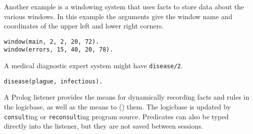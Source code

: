 Another example is a windowing system that uses facts to store data about the
various windows. In this example the arguments give the window name and
coordinates of the upper left and lower right corners.
\begin{verbatim}
window(main, 2, 2, 20, 72).
window(errors, 15, 40, 20, 78).
\end{verbatim}

A medical diagnostic expert system might have \verb'disease/2'.
\begin{verbatim}
disease(plague, infectious).
\end{verbatim}

A Prolog listener provides the means for dynamically recording facts and rules
in the logicbase, as well as the means to 
() them. The logicbase is updated by
\verb'consult'ing or \verb'reconsult'ing program source. Predicates can also be
typed directly into the listener, but they are not saved between sessions.


\secup